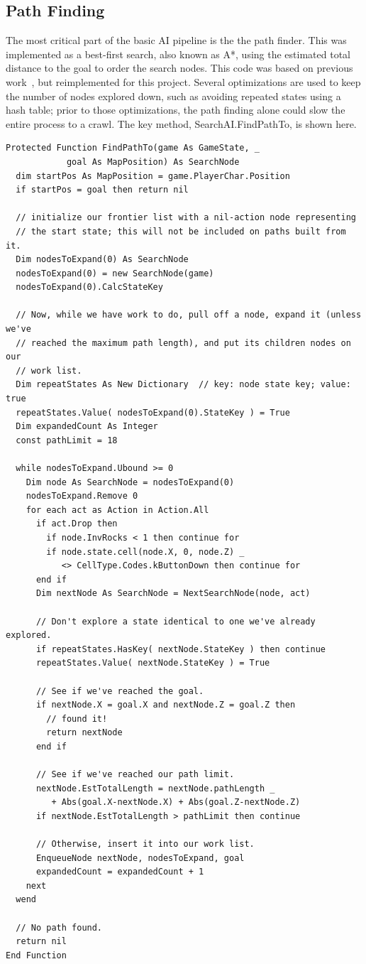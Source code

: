 \documentclass{article}
\begin{document}
\subsection{Path Finding}

The most critical part of the basic AI pipeline is the the path finder.  This was implemented as a best-first search, also known as A*, using the estimated total distance to the goal to order the search nodes.  This code was based on previous work~\cite{Strout2003}, but reimplemented for this project.  Several optimizations are used to keep the number of nodes explored down, such as avoiding repeated states using a hash table; prior to those optimizations, the path finding alone could slow the entire process to a crawl.  The key method, SearchAI.FindPathTo, is shown here.

\begin{lstlisting}
Protected Function FindPathTo(game As GameState, _
            goal As MapPosition) As SearchNode
  dim startPos As MapPosition = game.PlayerChar.Position
  if startPos = goal then return nil
  
  // initialize our frontier list with a nil-action node representing
  // the start state; this will not be included on paths built from it.
  Dim nodesToExpand(0) As SearchNode
  nodesToExpand(0) = new SearchNode(game)
  nodesToExpand(0).CalcStateKey
  
  // Now, while we have work to do, pull off a node, expand it (unless we've
  // reached the maximum path length), and put its children nodes on our
  // work list.
  Dim repeatStates As New Dictionary  // key: node state key; value: true
  repeatStates.Value( nodesToExpand(0).StateKey ) = True
  Dim expandedCount As Integer
  const pathLimit = 18
  
  while nodesToExpand.Ubound >= 0
    Dim node As SearchNode = nodesToExpand(0)
    nodesToExpand.Remove 0
    for each act as Action in Action.All
      if act.Drop then
        if node.InvRocks < 1 then continue for
        if node.state.cell(node.X, 0, node.Z) _
           <> CellType.Codes.kButtonDown then continue for
      end if
      Dim nextNode As SearchNode = NextSearchNode(node, act)
      
      // Don't explore a state identical to one we've already explored.
      if repeatStates.HasKey( nextNode.StateKey ) then continue
      repeatStates.Value( nextNode.StateKey ) = True
      
      // See if we've reached the goal.
      if nextNode.X = goal.X and nextNode.Z = goal.Z then
        // found it!
        return nextNode
      end if
      
      // See if we've reached our path limit.
      nextNode.EstTotalLength = nextNode.pathLength _
         + Abs(goal.X-nextNode.X) + Abs(goal.Z-nextNode.Z)
      if nextNode.EstTotalLength > pathLimit then continue
      
      // Otherwise, insert it into our work list.
      EnqueueNode nextNode, nodesToExpand, goal
      expandedCount = expandedCount + 1
    next
  wend
  
  // No path found.
  return nil  
End Function
\end{lstlisting}
\end{document}
